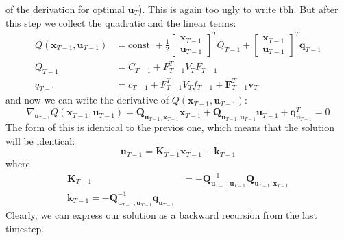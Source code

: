 \documentclass{report}
\begin{document}
of the derivation for optimal $ \bm{u}_{T}  $).
This is again too ugly to write tbh.
But after this step we collect the quadratic and the linear terms:
\begin{align}
Q (\bm{x}_{T-1}, \bm{u}_{T-1}) &= \text{const } + \frac{1}{2} 
\begin{bmatrix} \bm{x}_{T-1} \\ \bm{u}_{T-1} \end{bmatrix}^{ T } Q_{ T-1 } +
\begin{bmatrix} \bm{x}_{T-1} \\ \bm{u}_{T-1} \end{bmatrix}^{ T } \bm{q}_{T-1} \\
Q_{ T-1 } &= C_{ T-1 } + F_{ T-1 }^{ T }V_{ T }F_{ T-1 }\\
q_{ T-1 } &= c_{ T-1 } + F_{ T-1 }^{ T }V_{ T }f_{ T-1 } + \bm{F}_{T-1}^{ T }\bm{v}_{T}
\end{align}
and now we can write the derivative of $ Q (\bm{x}_{T-1}, \bm{u}_{T-1})  $:
\begin{equation}
\nabla_{ \bm{u}_{T-1} } Q (\bm{x}_{T-1}, \bm{u}_{T-1}) =
\bm{Q}_{\bm{u}_{T-1}, \bm{x}_{T-1}}\bm{x}_{T-1} +
\bm{Q}_{\bm{u}_{T-1}, \bm{u}_{T-1}}\bm{u}_{T-1} + \bm{q}_{\bm{u}_{T-1}}^{ T } = 0
\end{equation}
The form of this is identical to the previos one, which means that the solution will be identical:
\begin{equation}
\bm{u}_{T-1} = \bm{K}_{T-1}\bm{x}_{T-1} + \bm{k}_{T-1}
\end{equation}
where 
\begin{align}
\bm{K}_{T-1} &= - \bm{Q}_{\bm{u}_{T-1}, \bm{u}_{T-1}}^{-1 } \bm{Q}_{\bm{u}_{T-1}, \bm{x}_{T-1}} \\
\bm{k}_{T-1} = - \bm{Q}_{\bm{u}_{T-1}, \bm{u}_{T-1}}^{-1 } \bm{q}_{\bm{u}_{T-1}}
\end{align}
Clearly, we can express our solution as a backward recursion from the last timestep.
\end{document}
